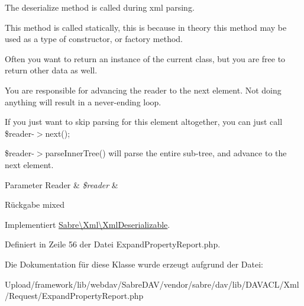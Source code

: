 The deserialize method is called during xml parsing.

This method is called statically, this is because in theory this method may be used as a type of constructor, or factory method.

Often you want to return an instance of the current class, but you are free to return other data as well.

You are responsible for advancing the reader to the next element. Not doing anything will result in a never-\/ending loop.

If you just want to skip parsing for this element altogether, you can just call \$reader-\/$>$next();

\$reader-\/$>$parse\+Inner\+Tree() will parse the entire sub-\/tree, and advance to the next element.


\begin{DoxyParams}[1]{Parameter}
Reader & {\em \$reader} & \\
\hline
\end{DoxyParams}
\begin{DoxyReturn}{Rückgabe}
mixed 
\end{DoxyReturn}


Implementiert \mbox{\hyperlink{interface_sabre_1_1_xml_1_1_xml_deserializable_a19e0eca545b9a0d93f7d6b69085ade30}{Sabre\textbackslash{}\+Xml\textbackslash{}\+Xml\+Deserializable}}.



Definiert in Zeile 56 der Datei Expand\+Property\+Report.\+php.



Die Dokumentation für diese Klasse wurde erzeugt aufgrund der Datei\+:\begin{DoxyCompactItemize}
\item 
Upload/framework/lib/webdav/\+Sabre\+D\+A\+V/vendor/sabre/dav/lib/\+D\+A\+V\+A\+C\+L/\+Xml/\+Request/Expand\+Property\+Report.\+php\end{DoxyCompactItemize}
